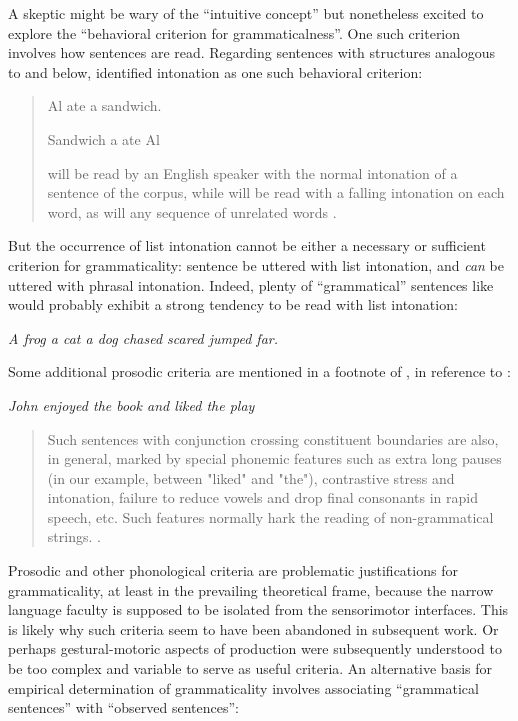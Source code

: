   A skeptic might be wary of the “intuitive concept” but nonetheless excited to explore the “behavioral criterion for grammaticalness”. One such criterion involves how sentences are read. Regarding sentences with structures analogous to  and  below, \citet{Chomsky1956} identified intonation as one such behavioral criterion:

\begin{quote} 
  
\ea\label{ex:6:1}
Al ate a sandwich.
\z


\ea\label{ex:6:2}
Sandwich a ate Al%
\z

 will be read by an English speaker with the normal intonation of a sentence of the corpus, while  will be read with a falling intonation on each word, as will any sequence of unrelated words \citep[114]{Chomsky1956}.

\end{quote}


  But the occurrence of list intonation cannot be either a necessary or sufficient criterion for grammaticality: sentence   be uttered with list intonation, and  \textit{can} be uttered with phrasal intonation. Indeed, plenty of “grammatical” sentences like  would probably exhibit a strong tendency to be read with list intonation: 

\ea\label{ex:6:3}
\textit{A frog a cat a dog chased scared jumped far.}
\z

Some additional prosodic criteria are mentioned in a footnote of \citet{Chomsky1957}, in reference to :

\ea\label{ex:6:4}
\textit{John enjoyed the book and liked the play}
\z

\begin{quote}
Such sentences with conjunction crossing constituent boundaries are also, in general, marked by special phonemic features such as extra long pauses (in our example, between "liked" and "the"), contrastive stress and intonation, failure to reduce vowels and drop final consonants in rapid speech, etc. Such features normally hark the reading of non-grammatical strings. \citep[35-36]{Chomsky1957}.
\end{quote}

Prosodic and other phonological criteria are problematic justifications for grammaticality, at least in the prevailing theoretical frame, because the narrow language faculty is supposed to be isolated from the sensorimotor interfaces. This is likely why such criteria seem to have been abandoned in subsequent work. Or perhaps gestural-motoric aspects of production were subsequently understood to be too complex and variable to serve as useful criteria. An alternative basis for empirical determination of grammaticality involves associating “grammatical sentences” with “observed sentences”:

